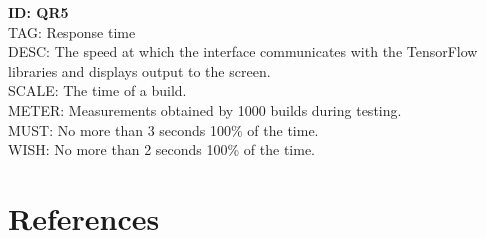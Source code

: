 \documentclass[journal,10pt,onecolumn,compsoc]{IEEEtran} \usepackage[margin=1.0in]{geometry} \usepackage{pdfpages} \usepackage{graphicx}
\begin{document}
\noindent
\textbf{ID: QR5}\\
TAG: Response time\\
DESC: The speed at which the interface communicates with the TensorFlow libraries and displays output to the screen.\\
SCALE: The time of a build.\\
METER: Measurements obtained by 1000 builds during testing.\\
MUST: No more than 3 seconds 100\% of the time.\\
WISH: No more than 2 seconds 100\% of the time.\\

\newpage


\newpage
\section{References}

\end{document}
